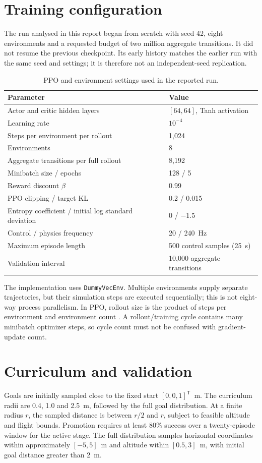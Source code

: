 \section{Training configuration}
The run analysed in this report began from scratch with seed 42, eight environments and a requested budget of two million aggregate transitions. It did not resume the previous checkpoint. Its early history matches the earlier run with the same seed and settings; it is therefore not an independent-seed replication.

\begin{table}[htbp]\centering
\caption{PPO and environment settings used in the reported run.}\label{tab:hyperparameters}
\begin{tabular}{ll}\toprule Parameter & Value\\\midrule
Actor and critic hidden layers & $[64,64]$, Tanh activation\\
Learning rate & $10^{-4}$\\
Steps per environment per rollout & 1,024\\
Environments & 8\\
Aggregate transitions per full rollout & 8,192\\
Minibatch size / epochs & 128 / 5\\
Reward discount $\beta$ & 0.99\\
PPO clipping / target KL & 0.2 / 0.015\\
Entropy coefficient / initial log standard deviation & 0 / $-1.5$\\
Control / physics frequency & 20 / 240~Hz\\
Maximum episode length & 500 control samples (25~s)\\
Validation interval & 10,000 aggregate transitions\\\bottomrule
\end{tabular}\end{table}

The implementation uses \texttt{DummyVecEnv}. Multiple environments supply separate trajectories, but their simulation steps are executed sequentially; this is not eight-way process parallelism. In PPO, rollout size is the product of steps per environment and environment count \parencite{sb3ppo}. A rollout/training cycle contains many minibatch optimizer steps, so cycle count must not be confused with gradient-update count.

\section{Curriculum and validation}
Goals are initially sampled close to the fixed start $[0,0,1]^\mathsf{T}$~m. The curriculum radii are 0.4, 1.0 and 2.5~m, followed by the full goal distribution. At a finite radius $r$, the sampled distance is between $r/2$ and $r$, subject to feasible altitude and flight bounds. Promotion requires at least 80\% success over a twenty-episode window for the active stage. The full distribution samples horizontal coordinates within approximately $[-5,5]$~m and altitude within $[0.5,3]$~m, with initial goal distance greater than 2~m.

